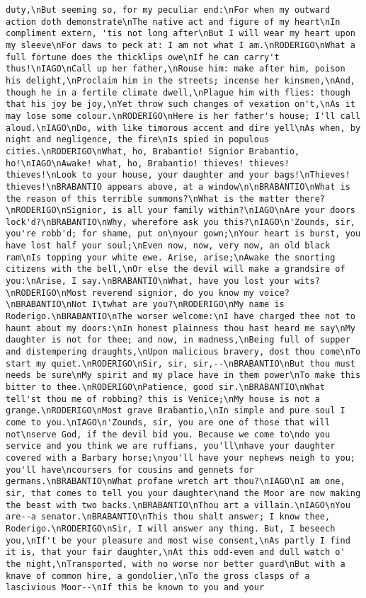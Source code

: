 \begin{verbatim}
duty,\nBut seeming so, for my peculiar end:\nFor when my outward action doth demonstrate\nThe native act and figure of my heart\nIn compliment extern, 'tis not long after\nBut I will wear my heart upon my sleeve\nFor daws to peck at: I am not what I am.\nRODERIGO\nWhat a full fortune does the thicklips owe\nIf he can carry't thus!\nIAGO\nCall up her father,\nRouse him: make after him, poison his delight,\nProclaim him in the streets; incense her kinsmen,\nAnd, though he in a fertile climate dwell,\nPlague him with flies: though that his joy be joy,\nYet throw such changes of vexation on't,\nAs it may lose some colour.\nRODERIGO\nHere is her father's house; I'll call aloud.\nIAGO\nDo, with like timorous accent and dire yell\nAs when, by night and negligence, the fire\nIs spied in populous cities.\nRODERIGO\nWhat, ho, Brabantio! Signior Brabantio, ho!\nIAGO\nAwake! what, ho, Brabantio! thieves! thieves! thieves!\nLook to your house, your daughter and your bags!\nThieves! thieves!\nBRABANTIO appears above, at a window\n\nBRABANTIO\nWhat is the reason of this terrible summons?\nWhat is the matter there?\nRODERIGO\nSignior, is all your family within?\nIAGO\nAre your doors lock'd?\nBRABANTIO\nWhy, wherefore ask you this?\nIAGO\n'Zounds, sir, you're robb'd; for shame, put on\nyour gown;\nYour heart is burst, you have lost half your soul;\nEven now, now, very now, an old black ram\nIs topping your white ewe. Arise, arise;\nAwake the snorting citizens with the bell,\nOr else the devil will make a grandsire of you:\nArise, I say.\nBRABANTIO\nWhat, have you lost your wits?\nRODERIGO\nMost reverend signior, do you know my voice?\nBRABANTIO\nNot I\twhat are you?\nRODERIGO\nMy name is Roderigo.\nBRABANTIO\nThe worser welcome:\nI have charged thee not to haunt about my doors:\nIn honest plainness thou hast heard me say\nMy daughter is not for thee; and now, in madness,\nBeing full of supper and distempering draughts,\nUpon malicious bravery, dost thou come\nTo start my quiet.\nRODERIGO\nSir, sir, sir,--\nBRABANTIO\nBut thou must needs be sure\nMy spirit and my place have in them power\nTo make this bitter to thee.\nRODERIGO\nPatience, good sir.\nBRABANTIO\nWhat tell'st thou me of robbing? this is Venice;\nMy house is not a grange.\nRODERIGO\nMost grave Brabantio,\nIn simple and pure soul I come to you.\nIAGO\n'Zounds, sir, you are one of those that will not\nserve God, if the devil bid you. Because we come to\ndo you service and you think we are ruffians, you'll\nhave your daughter covered with a Barbary horse;\nyou'll have your nephews neigh to you; you'll have\ncoursers for cousins and gennets for germans.\nBRABANTIO\nWhat profane wretch art thou?\nIAGO\nI am one, sir, that comes to tell you your daughter\nand the Moor are now making the beast with two backs.\nBRABANTIO\nThou art a villain.\nIAGO\nYou are--a senator.\nBRABANTIO\nThis thou shalt answer; I know thee, Roderigo.\nRODERIGO\nSir, I will answer any thing. But, I beseech you,\nIf't be your pleasure and most wise consent,\nAs partly I find it is, that your fair daughter,\nAt this odd-even and dull watch o' the night,\nTransported, with no worse nor better guard\nBut with a knave of common hire, a gondolier,\nTo the gross clasps of a lascivious Moor--\nIf this be known to you and your 
\end{verbatim}
